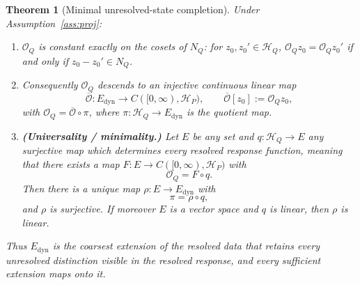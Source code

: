 \documentclass[11pt,reqno]{amsart}
\numberwithin{equation}{section}
\theoremstyle{plain}
\newtheorem{theorem}{Theorem}[section]
\theoremstyle{definition}
\theoremstyle{remark}
\newcommand{\HP}{\mathcal{H}_{P}}
\newcommand{\HQ}{\mathcal{H}_{Q}}
\newcommand{\Edyn}{E_{\mathrm{dyn}}}
\newcommand{\Op}{\mathcal{O}_{Q}}
\begin{document}
\begin{theorem}[Minimal unresolved-state completion]
\label{thm:minimal}
Under Assumption~\ref{ass:proj}:
\begin{enumerate}
\item $\Op$ is constant exactly on the cosets of $N_{Q}$: for $z_{0},z_{0}'\in\HQ$,
$\Op z_{0}=\Op z_{0}'$ if and only if $z_{0}-z_{0}'\in N_{Q}$.
\item Consequently $\Op$ descends to an \emph{injective} continuous linear map
\begin{equation}
\label{eq:Obar}
\overline{\mathcal{O}}:\Edyn\longrightarrow C([0,\infty),\HP),
\qquad
\overline{\mathcal{O}}[z_{0}]:=\Op z_{0},
\end{equation}
with $\Op=\overline{\mathcal{O}}\circ\pi$, where $\pi:\HQ\to\Edyn$ is the quotient map.
\item \textbf{(Universality / minimality.)} Let $E$ be any set and $q:\HQ\to E$ any surjective
map which \emph{determines every resolved response function}, meaning that there exists a map
$F:E\to C([0,\infty),\HP)$ with
\begin{equation}
\label{eq:factorsthrough}
\Op=F\circ q .
\end{equation}
Then there is a unique map $\rho:E\to\Edyn$ with
\begin{equation}
\label{eq:universal}
\pi=\rho\circ q ,
\end{equation}
and $\rho$ is surjective. If moreover $E$ is a vector space and $q$ is linear, then $\rho$ is
linear.
\end{enumerate}
Thus $\Edyn$ is the coarsest extension of the resolved data that retains every unresolved
distinction visible in the resolved response, and every sufficient extension maps onto it.
\end{theorem}
\end{document}
